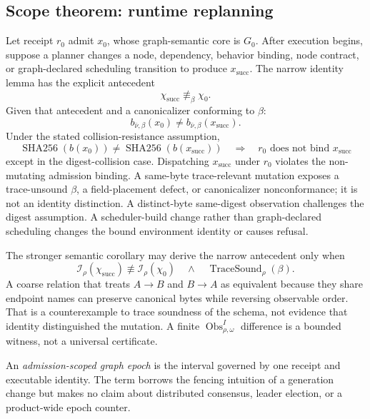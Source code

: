 \documentclass[11pt]{article}
\begin{document}
\subsection*{Scope theorem: runtime replanning}

Let receipt \(r_0\) admit \(x_0\), whose graph-semantic core is \(G_0\). After
execution begins, suppose a planner changes a node, dependency, behavior
binding, node contract, or graph-declared scheduling transition to produce
\(x_{\mathrm{succ}}\). The narrow identity lemma has the explicit antecedent
\[
\chi_{\mathrm{succ}}\not\equiv_\beta\chi_0.
\]
Given that antecedent and a canonicalizer conforming to \(\beta\):
\[
  b_{\bar\nu,\beta}(x_0)
  \ne b_{\bar\nu,\beta}(x_{\mathrm{succ}}).
\]
Under the stated collision-resistance assumption,
\[
  \operatorname{SHA256}(b(x_0))
  \ne \operatorname{SHA256}(b(x_{\mathrm{succ}}))
  \quad\Longrightarrow\quad
  r_0 \text{ does not bind }x_{\mathrm{succ}}
\]
except in the digest-collision case. Dispatching \(x_{\mathrm{succ}}\) under
\(r_0\) violates the non-mutating admission binding. A same-byte
trace-relevant mutation exposes a trace-unsound \(\beta\), a field-placement
defect, or canonicalizer nonconformance; it is not an identity distinction. A
distinct-byte same-digest observation challenges the digest assumption. A
scheduler-build change rather than graph-declared scheduling changes the bound
environment identity or causes refusal.

The stronger semantic corollary may derive the narrow antecedent only when
\[
\mathcal I_\rho(\chi_{\mathrm{succ}})\not\equiv
\mathcal I_\rho(\chi_0)
\quad\land\quad
\operatorname{TraceSound}_\rho(\beta).
\]
A coarse relation that treats \(A\!\to\!B\) and \(B\!\to\!A\) as equivalent
because they share endpoint names can preserve canonical bytes while reversing
observable order. That is a counterexample to trace soundness of the schema,
not evidence that identity distinguished the mutation. A finite
\(\operatorname{Obs}^{I}_{\rho,\omega}\) difference is a bounded witness, not a
universal certificate.

An \emph{admission-scoped graph epoch} is the interval governed by one receipt
and executable identity. The term borrows the fencing intuition of a
generation change but makes no claim about distributed consensus, leader
election, or a product-wide epoch counter.
\end{document}
